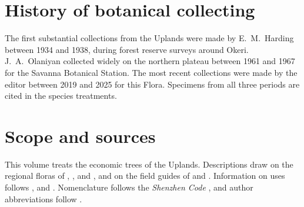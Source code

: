 \section{History of botanical collecting}
The first substantial collections from the Uplands were made by
E.~M.~Harding between 1934 and 1938, during forest reserve surveys
around Okeri. J.~A.~Olaniyan collected widely on the northern plateau
between 1961 and 1967 for the Savanna Botanical Station. The most
recent collections were made by the editor between 2019 and 2025 for
this Flora. Specimens from all three periods are cited in the species
treatments.

\section{Scope and sources}
This volume treats the economic trees of the Uplands. Descriptions
draw on the regional floras of \citet{hutchinson1954},
\citet{aubreville1959}, \citet{keay1989} and \citet{akeassi2001}, and
on the field guides of \citet{arbonnier2004} and
\citet{hawthorne2006}. Information on uses follows
\citet{burkill1985}, \citet{louppe2008} and \citet{orwa2009}.
Nomenclature follows the \textit{Shenzhen Code} \citep{turland2018},
and author abbreviations follow \citet{brummitt1992}.
